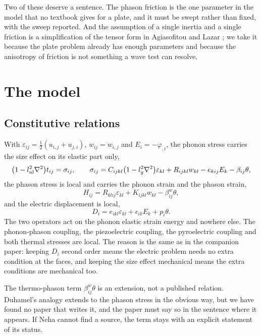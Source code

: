 \documentclass[11pt]{article}
\begin{document}
Two of these deserve a sentence. The phason friction is the one parameter in the model that no textbook
gives for a plate, and it must be swept rather than fixed, with the sweep reported. And the assumption of a
single inertia and a single friction is a simplification of the tensor form in Agiasofitou and Lazar
\cite{Agiasofitou2014}; we take it because the plate problem already has enough parameters and because the
anisotropy of friction is not something a wave test can resolve.

\section{The model}

\subsection{Constitutive relations}

With $\varepsilon_{ij}=\tfrac12(u_{i,j}+u_{j,i})$, $w_{ij}=w_{i,j}$ and $E_i=-\varphi_{,i}$, the phonon
stress carries the size effect on its elastic part only,
\begin{equation}
\bigl(1-l_{\rm nl}^2\nabla^2\bigr)t_{ij}=\sigma_{ij},\qquad
\sigma_{ij}=C_{ijkl}\bigl(1-l_g^2\nabla^2\bigr)\varepsilon_{kl}+R_{ijkl}w_{kl}
-e_{kij}E_k-\beta_{ij}\theta ,
\end{equation}
the phason stress is local and carries the phonon strain and the phason strain,
\begin{equation}
H_{ij}=R_{klij}\varepsilon_{kl}+K_{ijkl}w_{kl}-\beta^{w}_{ij}\theta ,
\end{equation}
and the electric displacement is local,
\begin{equation}
D_i=e_{ikl}\varepsilon_{kl}+\epsilon_{ik}E_k+p_i\theta .
\end{equation}
The two operators act on the phonon elastic strain energy and nowhere else. The phonon-phason coupling, the
piezoelectric coupling, the pyroelectric coupling and both thermal stresses are local. The reason is the
same as in the companion paper: keeping $D_i$ second order means the electric problem needs no extra
condition at the faces, and keeping the size effect mechanical means the extra conditions are mechanical
too.

The thermo-phason term $\beta^{w}_{ij}\theta$ is an extension, not a published relation. Duhamel's analogy
extends to the phason stress in the obvious way, but we have found no paper that writes it, and the paper
must say so in the sentence where it appears. If Neha cannot find a source, the term stays with an explicit
statement of its status.
\end{document}
